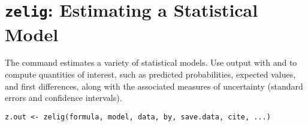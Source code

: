  \section{{\tt zelig}: Estimating a Statistical Model}\label{ss:zelig}
\begin{Description}\relax
The  command estimates a variety of statistical
models.  Use  output with  and  to compute
quantities of interest, such as predicted probabilities, expected values, and
first differences, along with the associated measures of uncertainty
(standard errors and confidence intervals).
\end{Description}
\begin{Usage}
\begin{verbatim}
z.out <- zelig(formula, model, data, by, save.data, cite, ...) 
\end{verbatim}
\end{Usage}
